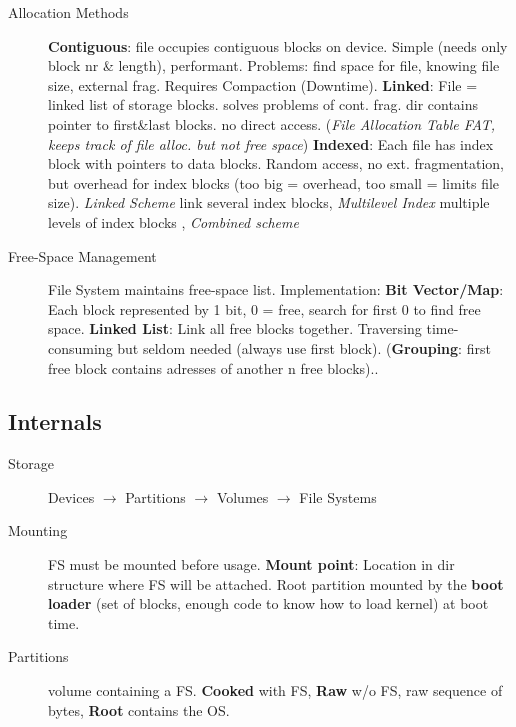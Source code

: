 \begin{description}
    \item[Allocation Methods] \textbf{Contiguous}: file occupies contiguous blocks on device. Simple (needs only block nr \& length), performant. Problems: find space for file, knowing file size, external frag. Requires Compaction (Downtime). %
        \textbf{Linked}: File = linked list of storage blocks. solves problems of cont. frag. dir contains pointer to first\&last blocks. no direct access. (\textit{File Allocation Table FAT, keeps track of file alloc. but not free space})
        \textbf{Indexed}: Each file has index block with pointers to data blocks. Random access, no ext. fragmentation, but overhead for index blocks (too big = overhead, too small = limits file size). \textit{Linked Scheme} link several index blocks, \textit{Multilevel Index} multiple levels of index blocks , \textit{Combined scheme}
    \item[Free-Space Management] File System maintains free-space list. Implementation: \textbf{Bit Vector/Map}: Each block represented by 1 bit, 0 = free, search for first 0 to find free space. \textbf{Linked List}: Link all free blocks together. Traversing time-consuming but seldom needed (always use first block). (\textbf{Grouping}: first free block contains adresses of another n free blocks)..
\end{description}

\subsection*{Internals}
\begin{description}
    \item[Storage] Devices $\rightarrow$ Partitions $\rightarrow$ Volumes $\rightarrow$ File Systems
    \item[Mounting] FS must be mounted before usage. \textbf{Mount point}: Location in dir structure where FS will be attached. Root partition mounted by the \textbf{boot loader} (set of blocks, enough code to know how to load kernel) at boot time.
    \item[Partitions] volume containing a FS. \textbf{Cooked} with FS, \textbf{Raw} w/o FS, raw sequence of bytes, \textbf{Root} contains the OS.
\end{description}
